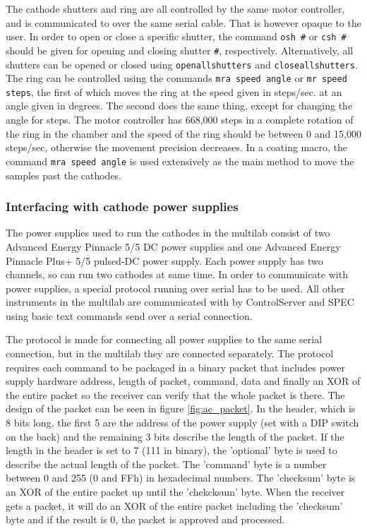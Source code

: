 The cathode shutters and ring are all controlled by the same motor controller, and is communicated to over the same serial cable. That is however opaque to the user. In order to open or close a specific shutter, the command \verb'osh #' or \verb'csh #' should be given for opening and closing shutter \verb'#', respectively. Alternatively, all shutters can be opened or closed using \verb'openallshutters' and \verb'closeallshutters'. The ring can be controlled using the commands \verb'mra speed angle' or \verb'mr speed steps', the first of which moves the ring at the speed given in steps/sec. at an angle given in degrees. The second does the same thing, except for changing the angle for steps. The motor controller has 668,000 steps in a complete rotation of the ring in the chamber and the speed of the ring should be between 0 and 15,000 steps/sec, otherwise the movement precision decreases. In a coating macro, the command \verb'mra speed angle' is used extensively as the main method to move the samples past the cathodes.%

\subsubsection{Interfacing with cathode power supplies}
The power supplies used to run the cathodes in the multilab consist of two Advanced Energy Pinnacle 5/5 DC power supplies and one Advanced Energy Pinnacle Plus+ 5/5 pulsed-DC power supply. Each power supply has two channels, so can run two cathodes at same time. In order to communicate with power supplies, a special protocol running over serial has to be used. All other instruments in the multilab are communicated with by ControlServer and SPEC using basic text commands send over a serial connection.

The protocol is made for connecting all power supplies to the same serial connection, but in the multilab they are connected separately. The protocol requires each command to be packaged in a binary packet that includes power supply hardware address, length of packet, command, data and finally an XOR of the entire packet so the receiver can verify that the whole packet is there. The design of the packet can be seen in figure \ref{fig:ae_packet}. In the header, which is 8 bits long, the first 5 are the address of the power supply (set with a DIP switch on the back) and the remaining 3 bits describe the length of the packet. If the length in the header is set to 7 (111 in binary), the 'optional' byte is used to describe the actual length of the packet. The 'command' byte is a number between 0 and 255 (0 and FFh) in hexadecimal numbers. The 'checksum' byte is an XOR of the entire packet up until the 'chekcksum' byte. When the receiver gets a packet, it will do an XOR of the entire packet including the 'checksum' byte and if the result is 0, the packet is approved and processed.

